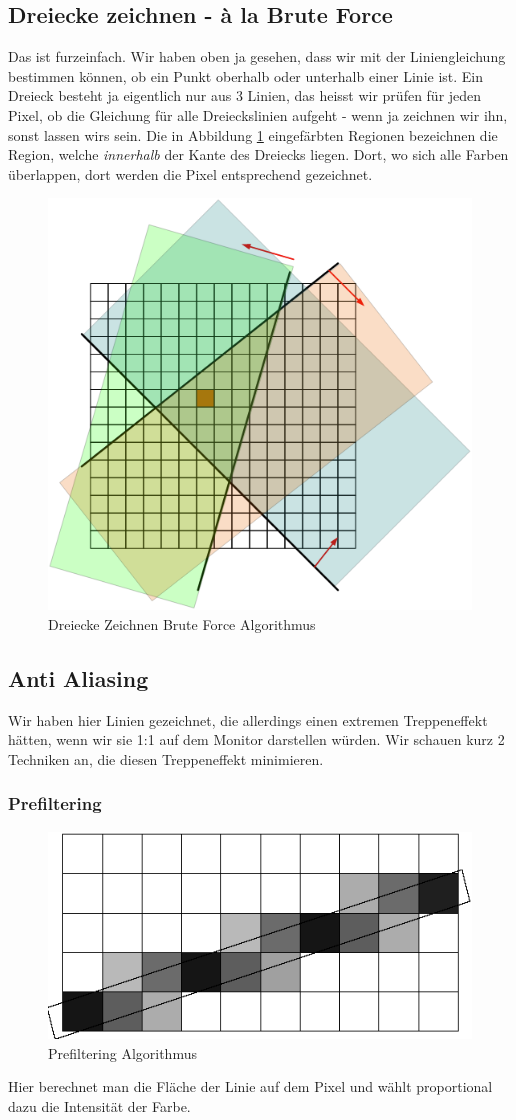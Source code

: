 \subsection{Dreiecke zeichnen - à la Brute Force}
Das ist furzeinfach. Wir haben oben ja gesehen, dass wir mit der Liniengleichung bestimmen können, ob ein Punkt oberhalb oder unterhalb einer Linie ist. Ein Dreieck besteht ja eigentlich nur aus 3 Linien, das heisst wir prüfen für jeden Pixel, ob die Gleichung für alle Dreieckslinien aufgeht - wenn ja zeichnen wir ihn, sonst lassen wirs sein. Die in Abbildung \ref{dreiecke_zeichnen} eingefärbten Regionen bezeichnen die Region, welche \textit{innerhalb} der Kante des Dreiecks liegen. Dort, wo sich alle Farben überlappen, dort werden die Pixel entsprechend gezeichnet.
\begin{figure}[!ht]
	\centering
	\includegraphics[width=0.5\linewidth]{fig/dreiecke_zeichnen}
	\caption{Dreiecke Zeichnen Brute Force Algorithmus}
	\label{dreiecke_zeichnen}
\end{figure}
\subsection{Anti Aliasing}
Wir haben hier Linien gezeichnet, die allerdings einen extremen Treppeneffekt hätten, wenn wir sie 1:1 auf dem Monitor darstellen würden. Wir schauen kurz 2 Techniken an, die diesen Treppeneffekt minimieren.
\subsubsection{Prefiltering}
\begin{figure}[!ht]
	\centering
	\includegraphics[width=0.5\linewidth]{fig/prefiltering}
	\caption{Prefiltering Algorithmus}
	\label{prefiltering}
\end{figure}
Hier berechnet man die Fläche der Linie auf dem Pixel und wählt proportional dazu die Intensität der Farbe. 

